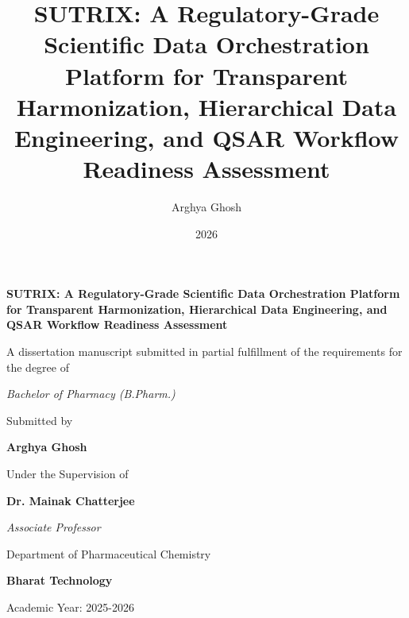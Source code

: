 \documentclass[12pt,a4paper,oneside]{book}
\title{SUTRIX: A Regulatory-Grade Scientific Data Orchestration Platform for Transparent Harmonization, Hierarchical Data Engineering, and QSAR Workflow Readiness Assessment}
\author{Arghya Ghosh}
\date{2026}
\begin{document}
\frontmatter

\begin{titlepage}
    \centering
    \vspace*{2cm}
    {\LARGE\bfseries\color{navyblue} SUTRIX: A Regulatory-Grade Scientific Data Orchestration Platform for Transparent Harmonization, Hierarchical Data Engineering, and QSAR Workflow Readiness Assessment \par}
    \vspace{2cm}
    {\large A dissertation manuscript submitted in partial fulfillment of the requirements for the degree of \par}
    {\large\itshape Bachelor of Pharmacy (B.Pharm.) \par}
    \vspace{2.5cm}
    {\large Submitted by \par}
    {\large\bfseries Arghya Ghosh \par}
    \vspace{2cm}
    {\large Under the Supervision of \par}
    {\large\bfseries Dr. Mainak Chatterjee \par}
    {\large\itshape Associate Professor \par}
    \vspace{3cm}
    {\large Department of Pharmaceutical Chemistry \par}
    {\large\bfseries Bharat Technology \par}
    {\large Academic Year: 2025-2026 \par}
\end{titlepage}

\clearpage

\tableofcontents
\listoffigures
\listoftables

\mainmatter












\backmatter


\end{document}
